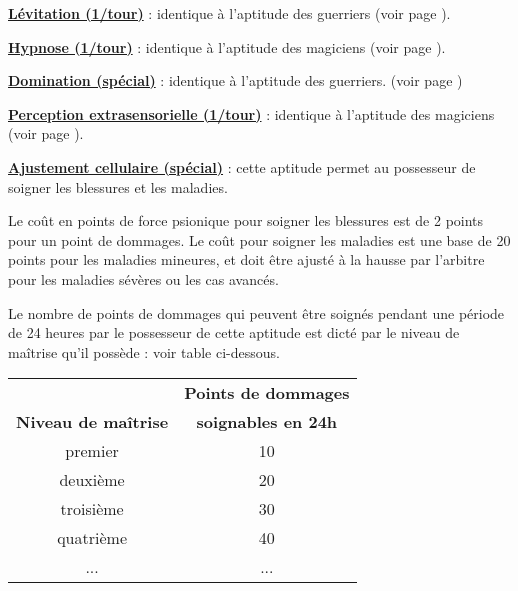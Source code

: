 \bigskip

\textbf{\uline{Lévitation (1/tour)}} : identique à l'aptitude des guerriers (voir page \pageref{guerrier-levitation}).

\bigskip

\textbf{\uline{Hypnose (1/tour)}} : identique à l'aptitude des magiciens (voir page \pageref{magicien-hypnose}).

\bigskip

\textbf{\uline{Domination (spécial)}} : identique à l'aptitude des guerriers. (voir page \pageref{guerrier-domination})

\bigskip

\textbf{\uline{Perception extrasensorielle (1/tour)}} : identique à l'aptitude des magiciens (voir page \pageref{magicien-ESP}).

\bigskip

\label{clerc-ajustement-cellulaire}\textbf{\uline{Ajustement cellulaire (spécial)}} : cette aptitude permet au possesseur de soigner les blessures et les maladies.

\bigskip

Le coût en points de force psionique pour soigner les blessures est de 2 points pour un point de dommages. Le coût pour soigner les maladies est une base de 20 points pour les maladies mineures, et doit être ajusté à la hausse par l'arbitre pour les maladies sévères ou les cas avancés.

\bigskip

Le nombre de points de dommages qui peuvent être soignés pendant une période de 24 heures par le possesseur de cette aptitude est dicté par le niveau de maîtrise qu'il possède : voir table ci-dessous.

\bigskip

\begin{tabular}{cc}
& \textbf{Points de dommages} \\
\textbf{Niveau de maîtrise} & \textbf{soignables en 24h} \\
premier     & 10 \\
deuxième    & 20 \\
troisième   & 30 \\
quatrième   & 40 \\
...         & ...\\
\end{tabular}

